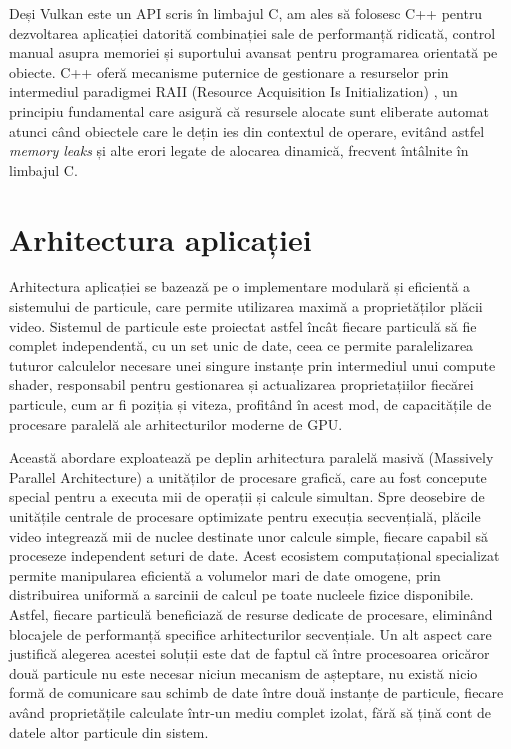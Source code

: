 Deși Vulkan este un API scris în limbajul C, am ales să folosesc C++ pentru dezvoltarea aplicației datorită combinației sale de performanță ridicată, control manual asupra memoriei și suportului avansat pentru programarea orientată pe obiecte. C++ oferă mecanisme puternice de gestionare a resurselor prin intermediul paradigmei RAII (Resource Acquisition Is Initialization) \cite{RAII_citation}, un principiu fundamental care asigură că resursele alocate sunt eliberate automat atunci când obiectele care le dețin ies din contextul de operare, evitând astfel \textit{memory leaks} și alte erori legate de alocarea dinamică, frecvent întâlnite în limbajul C. 

\section{Arhitectura aplicației}
Arhitectura aplicației se bazează pe o implementare modulară și eficientă a sistemului de particule, care permite utilizarea maximă a proprietăților plăcii video. Sistemul de particule este proiectat astfel încât fiecare particulă să fie complet independentă, cu un set unic de date, ceea ce permite paralelizarea tuturor calculelor necesare unei singure instanțe prin intermediul unui compute shader, responsabil pentru gestionarea și actualizarea proprietațiilor fiecărei particule, cum ar fi poziția și viteza, profitând în acest mod, de capacitățile de procesare paralelă ale arhitecturilor moderne de GPU. 

Această abordare exploatează pe deplin arhitectura paralelă masivă \cite{ParallelArchitectures_citation} (Massively Parallel Architecture) a unităților de procesare grafică, care au fost concepute special pentru a executa mii de operații și calcule simultan. Spre deosebire de unitățile centrale de procesare optimizate pentru execuția secvențială, plăcile video integrează mii de nuclee destinate unor calcule simple, fiecare capabil să proceseze independent seturi de date. Acest ecosistem computațional specializat permite manipularea eficientă a volumelor mari de date omogene, prin distribuirea uniformă a sarcinii de calcul pe toate nucleele fizice disponibile. Astfel, fiecare particulă beneficiază de resurse dedicate de procesare, eliminând blocajele de performanță specifice arhitecturilor secvențiale. Un alt aspect care justifică alegerea acestei soluții este dat de faptul că între procesoarea oricăror două particule nu este necesar niciun mecanism de așteptare, nu există nicio formă de comunicare sau schimb de date între două instanțe de particule, fiecare având proprietățile calculate într-un mediu complet izolat, fără să țină cont de datele altor particule din sistem. 

